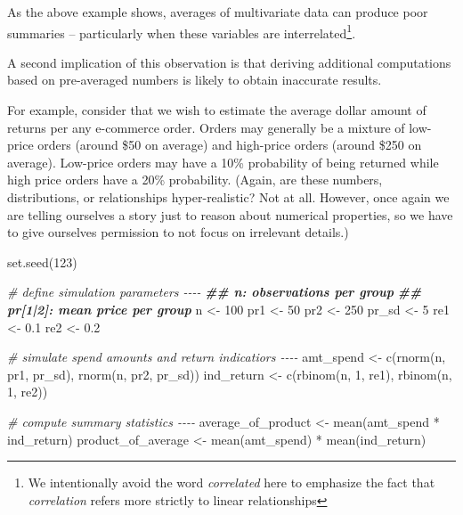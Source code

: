 \documentclass[
]{krantz}
\makeatletter
\newenvironment{Shaded}{\begin{snugshade}}{\end{snugshade}}
\newcommand{\CommentTok}[1]{\textcolor[rgb]{0.37,0.37,0.37}{\textit{#1}}}
\newcommand{\DecValTok}[1]{\textcolor[rgb]{0.06,0.06,0.06}{#1}}
\newcommand{\DocumentationTok}[1]{\textcolor[rgb]{0.37,0.37,0.37}{\textbf{\textit{#1}}}}
\newcommand{\FloatTok}[1]{\textcolor[rgb]{0.06,0.06,0.06}{#1}}
\newcommand{\FunctionTok}[1]{\textcolor[rgb]{0,0,0}{#1}}
\newcommand{\NormalTok}[1]{#1}
\newcommand{\OtherTok}[1]{\textcolor[rgb]{0.37,0.37,0.37}{#1}}
\newcommand{\SpecialCharTok}[1]{\textcolor[rgb]{0,0,0}{#1}}
\newenvironment{kframe}{%
\medskip{}
\setlength{\fboxsep}{.8em}
 \def\at@end@of@kframe{}%
 \ifinner\ifhmode%
  \def\at@end@of@kframe{\end{minipage}}%
  \begin{minipage}{\columnwidth}%
 \fi\fi%
 \def\FrameCommand##1{\hskip\@totalleftmargin \hskip-\fboxsep
 \colorbox{shadecolor}{##1}\hskip-\fboxsep
     \hskip-\linewidth \hskip-\@totalleftmargin \hskip\columnwidth}%
 \MakeFramed {\advance\hsize-\width
   \@totalleftmargin\z@ \linewidth\hsize
   \@setminipage}}%
 {\par\unskip\endMakeFramed%
 \at@end@of@kframe}
\renewenvironment{Shaded}{\begin{kframe}}{\end{kframe}}
\makeatother
\begin{document}
As the above example shows, averages of multivariate data can produce poor summaries -- particularly when these variables are interrelated\footnote{We intentionally avoid the word \emph{correlated} here to emphasize the fact that \emph{correlation} refers more strictly to linear relationships}.

A second implication of this observation is that deriving additional computations based on pre-averaged numbers is likely to obtain inaccurate results.

For example, consider that we wish to estimate the average dollar amount of returns per any e-commerce order.
Orders may generally be a mixture of low-price orders (around \$50 on average) and high-price orders (around \$250 on average).
Low-price orders may have a 10\% probability of being returned while high price orders have a 20\% probability.
(Again, are these numbers, distributions, or relationships hyper-realistic?
Not at all.
However, once again we are telling ourselves a story just to reason about numerical properties, so we have to give ourselves permission to not focus on irrelevant details.)

\begin{Shaded}
\begin{Highlighting}[]
\FunctionTok{set.seed}\NormalTok{(}\DecValTok{123}\NormalTok{)}

\CommentTok{\# define simulation parameters {-}{-}{-}{-}}
\DocumentationTok{\#\# n: observations per group}
\DocumentationTok{\#\# pr[1|2]: mean price per group}
\NormalTok{n }\OtherTok{\textless{}{-}} \DecValTok{100}
\NormalTok{pr1 }\OtherTok{\textless{}{-}} \DecValTok{50}
\NormalTok{pr2 }\OtherTok{\textless{}{-}} \DecValTok{250}
\NormalTok{pr\_sd }\OtherTok{\textless{}{-}} \DecValTok{5}
\NormalTok{re1 }\OtherTok{\textless{}{-}} \FloatTok{0.1}
\NormalTok{re2 }\OtherTok{\textless{}{-}} \FloatTok{0.2}

\CommentTok{\# simulate spend amounts and return indicatiors {-}{-}{-}{-}}
\NormalTok{amt\_spend  }\OtherTok{\textless{}{-}} \FunctionTok{c}\NormalTok{(}\FunctionTok{rnorm}\NormalTok{(n, pr1, pr\_sd), }\FunctionTok{rnorm}\NormalTok{(n, pr2, pr\_sd))}
\NormalTok{ind\_return }\OtherTok{\textless{}{-}} \FunctionTok{c}\NormalTok{(}\FunctionTok{rbinom}\NormalTok{(n, }\DecValTok{1}\NormalTok{, re1),    }\FunctionTok{rbinom}\NormalTok{(n, }\DecValTok{1}\NormalTok{, re2))}

\CommentTok{\# compute summary statistics {-}{-}{-}{-}}
\NormalTok{average\_of\_product }\OtherTok{\textless{}{-}} \FunctionTok{mean}\NormalTok{(amt\_spend }\SpecialCharTok{*}\NormalTok{ ind\_return)}
\NormalTok{product\_of\_average }\OtherTok{\textless{}{-}} \FunctionTok{mean}\NormalTok{(amt\_spend) }\SpecialCharTok{*} \FunctionTok{mean}\NormalTok{(ind\_return)}
\end{Highlighting}
\end{Shaded}
\end{document}
